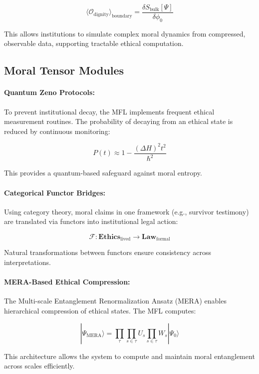 \documentclass[12]{amsart}
\theoremstyle{plain}
\begin{document}
\[
\langle \mathcal{O}_{\text{dignity}} \rangle_{\text{boundary}} = \frac{\delta S_{\text{bulk}}[\Psi]}{\delta \phi_0}
\]

This allows institutions to simulate complex moral dynamics from compressed, observable data, supporting tractable ethical computation.

\subsection{Moral Tensor Modules}

\paragraph{Quantum Zeno Protocols:}

To prevent institutional decay, the MFL implements frequent ethical measurement routines. The probability of decaying from an ethical state is reduced by continuous monitoring:

\[
P(t) \approx 1 - \frac{(\Delta H)^2 t^2}{\hbar^2}
\]

This provides a quantum-based safeguard against moral entropy.

\paragraph{Categorical Functor Bridges:}

Using category theory, moral claims in one framework (e.g., survivor testimony) are translated via functors into institutional legal action:

\[
\mathcal{F}: \mathbf{Ethics}_{\text{lived}} \rightarrow \mathbf{Law}_{\text{formal}}
\]

Natural transformations between functors ensure consistency across interpretations.

\paragraph{MERA-Based Ethical Compression:}

The Multi-scale Entanglement Renormalization Ansatz (MERA) enables hierarchical compression of ethical states. The MFL computes:

\[
|\Psi_{\text{MERA}}\rangle = \prod_{\tau}\prod_{s\in\tau}U_s \prod_{s\in\tau}W_s|\Psi_0\rangle
\]

This architecture allows the system to compute and maintain moral entanglement across scales efficiently.
\end{document}
